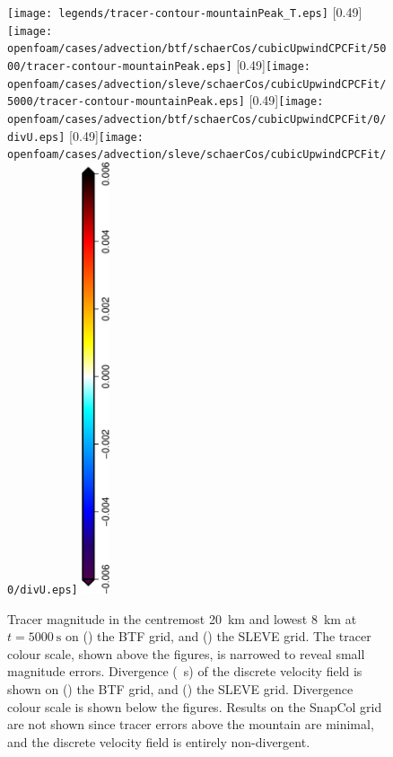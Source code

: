 \begin{figure}
	\captionsetup[subfigure]{position=b}
	\centering
	\texttt{[image: legends/tracer-contour-mountainPeak\_T.eps]}
%
	[0.49\textwidth]{\texttt{[image: openfoam/cases/advection/btf/schaerCos/cubicUpwindCPCFit/5000/tracer-contour-mountainPeak.eps]}}
	\hfill
	[0.49\textwidth]{\texttt{[image: openfoam/cases/advection/sleve/schaerCos/cubicUpwindCPCFit/5000/tracer-contour-mountainPeak.eps]}}
%
	[0.49\textwidth]{\texttt{[image: openfoam/cases/advection/btf/schaerCos/cubicUpwindCPCFit/0/divU.eps]}}
	\hfill
	[0.49\textwidth]{\texttt{[image: openfoam/cases/advection/sleve/schaerCos/cubicUpwindCPCFit/0/divU.eps]}}
%
	\includegraphics[height=5in,angle=270]{legends/divU.eps}
%
	\caption{Tracer magnitude in the centremost \SI{20}{\kilo\meter} and lowest \SI{8}{\kilo\meter} at $t = \SI{5000}{\second}$ on () the BTF grid, and () the SLEVE grid.  The tracer colour scale, shown above the figures, is narrowed to reveal small magnitude errors.  Divergence (\si{\per\second}) of the discrete velocity field is shown on () the BTF grid, and () the SLEVE grid.  Divergence colour scale is shown below the figures.  Results on the SnapCol grid are not shown since tracer errors above the mountain are minimal, and the discrete velocity field is entirely non-divergent.}
	\label{fig:advection:div}
\end{figure}

